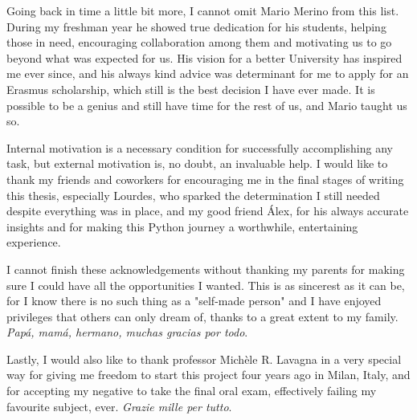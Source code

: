 Going back in time a little bit more, I cannot omit Mario Merino from this list. During my freshman year he showed true dedication for his students, helping those in need, encouraging collaboration among them and motivating us to go beyond what was expected for us. His vision for a better University has inspired me ever since, and his always kind advice was determinant for me to apply for an Erasmus scholarship, which still is the best decision I have ever made. It is possible to be a genius and still have time for the rest of us, and Mario taught us so. 

Internal motivation is a necessary condition for successfully accomplishing any task, but external motivation is, no doubt, an invaluable help. I would like to thank my friends and coworkers for encouraging me in the final stages of writing this thesis, especially Lourdes, who sparked the determination I still needed despite everything was in place, and my good friend Álex, for his always accurate insights and for making this Python journey a worthwhile, entertaining experience.

I cannot finish these acknowledgements without thanking my parents for making sure I could have all the opportunities I wanted. This is as sincerest as it can be, for I know there is no such thing as a "self-made person" and I have enjoyed privileges that others can only dream of, thanks to a great extent to my family. \textit{Papá, mamá, hermano, muchas gracias por todo}.

Lastly, I would also like to thank professor Michèle R. Lavagna in a very special way for giving me freedom to start this project four years ago in Milan, Italy, and for accepting my negative to take the final oral exam, effectively failing my favourite subject, ever. \textit{Grazie mille per tutto}.